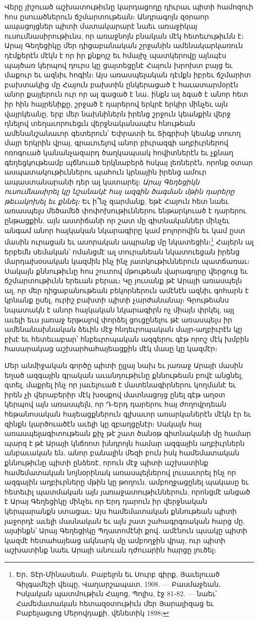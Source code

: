 \documentclass{article}
\begin{document}
{Վերը յիշուած աշխատութիւնը կարդացողը դիւրաւ պիտի համոզուի հոս ըսուածներուն ճշմարտութեան։ Անդրագոյն զօրաոր ապացոյցներ պիտի մատակարարէ նաեւ առաջիկայ ուսումնասիրութիւնս, որ առաջնոյն բնական մէկ հետեւութիւնն է։ Արայ Գեղեցիկը մեր դիցաբանական շրջանին ամենակարկառուն դէմքերէն մէկն է որ իր քնքոյշ եւ հմայիչ պատկերովը այնպէս պայծառ կերպով դուրս կը ցայտեցընէ Հայուն խրոխտ բայց եւ մաքուր եւ ազնիւ հոգին։ Այս առասպելական դէմքն իբրեւ ճշմարիտ բախտակից մը Հայուն բախտին ընկերացած է հաւատարմօրէն անոր քայլերուն ուր որ ալ գացած է նա․ ինքն ալ ձգած է անոր հետ իր հին հայրենիքը, շրջած է դարերով երկրէ երկիր մինչեւ այն վայրկեանը, երբ մեր նախնիներն իրենց շրջուն կեանքին վերջ դնելով տեղաւորուեցւն վերջնականապէս հնութեան ամենանշանաւոր գետերուն՝ Եփրատի եւ Տիգրիսի կեանք տուող մայր երկրին վրայ, գրաւուելով անոր բիւրազգի աղբիւրներով ոռոգուած կանանչազարդ ծաղկապսակ հովիտներէն եւ չքնաղ գեղեցկութեամբ պճնուած երկնաբերձ հսկայ լեռներէն, որոնք օտար ասպատակութիւններու պահուն կրնային իրենց ամուր ապաստանարանի դեր ալ կատարել։ \emph{Արայ Գեղեցիկն ուսումնասիրել կը նշանակէ հայ ազգին ծագման մթին դարերը թեւակոխել եւ քննել։} Եւ ի՞նչ զարմանք, եթէ Հայուն հետ նաեւ առասպելս մեծամեծ փոփոխութիւններու ենթարկուած է դարերու ընթացքին, այն աստիճանի որ շատ մը գիտնականներ մինչեւ անգամ անոր հայկական նկարագիրը կամ բոլորովին եւ կամ ըստ մասին ուրացան եւ ասորական ապրանք մը նկատեցին։\footnote{Եր․ Տէր֊Մինասեան․ Բաբելոն եւ Սուրբ գիրք, Յաւելուած Գիլգամեշի վեպը, Վաղարշապատ, 1908. — Բասմաջեան․ Իսկական պատմութիւն Հայոց, Պոլիս, էջ 81֊82. — նաեւ՝ Համեմատական հետազօտութիւն մեր Յարալիզաց եւ Բաբելացւոց Մերովդաքի, վենետիկ 1898։} Հայերն ալ երբեմն սեմական՝ ոմանցմէ ալ տուրանեան նկատուեցան իրենց մարդախօսական կազմին ինչ ինչ յատկութիւններուն պատճառաւ։ Սակայն քննութիւնը հոս շուտով մթութեան վարագոյրը վերցուց եւ ճշմարտութիւնն երեւան բերաւ։ Կը յուսանք թէ Արայի առասպելն ալ, որ մեր դիցաբանութեան բեկորներուն ամէնէն ազնիւ գոհարն է կրնանք ըսել, ուրիշ բախտի պիտի չարժանանայ։ Գրութեանս նպատակն է անոր հայկական նկարագիրն ոչ միայն փրկել, այլ աւելի եւս յառաջ երթալով փորձել ցուցընելու թէ առասպելս իր ամենանախնական ձեւին մէջ հնդեւրոպական մայր֊աղբիւրէն կը բխէ եւ հետեւաբար՝ հնբեւրոպական ազգերու գէթ որոշ մէկ խմբին հասարակաց աշխարհահայեացքին մէկ մասը կը կազմէր։

Մեր անմիջական գործը պիտի ըլլայ նախ եւ յառաջ Արայի մասին եղած ազգային գրական աւանդութիւնը քննութեան բովէ անցնել, զտել, մաքրել ինչ որ յաւելուած է մատենագիրներու կողմանէ եւ իրեն չի վերաբերիր մէկ խօսքով մատնացոյց ընել գէթ աղօտ կերպով այն առասպելն, որ Դ֊Երդ դարերու հայ ժողովրդեան հեթանոսական հայեացքներուն գլխաւոր առարկաներէն մէկն էր եւ զինքն կարծուածէն աւելի կը զբաղցընէր։ Սակայն հայ առասպելագիտութեան քիչ թէ շատ ծանօթ գիտնականի մը համար պարզ է թէ Արայի կնճռոտ խնդրոյն համար ազգային աղբիւրներն անբաւական են․ անոր բանալին մեզի բուն իսկ համեմատական քննութիւնը պիտի ընձեռէ, որուն մէջ պիտի աշխատինք համեմատական նոյնօրինակ առասպելներով լուսաւորել ինչ որ ազգային աղբիւրները մթին կը թողուն, ամբողջացընել պակասը եւ հետեւիլ պատմական այն յառաջատութիւններուն, որոնցմէ անցած է Արայ Գեղեցիկը մինչեւ որ Երդ դարուն իր վերջնական կերպարանքն ստացաւ։ Այս համեմատական քննութեան պիտի յաջորդէ աւելի մասնական եւ այն շատ շահագրգռական հարց մը, այսինքն՝ Արայ Գեղեցիկը Պղատոմէնի քով․ ամէնուն պսակը պիտի կազմէ հետահայեաց ակնարկ մը ամբողջին վրայ, ուր պիտի աշխատինք նաեւ Արայի անուան դժուարին հարցը լուծել։}
\clearpage
\end{document}
